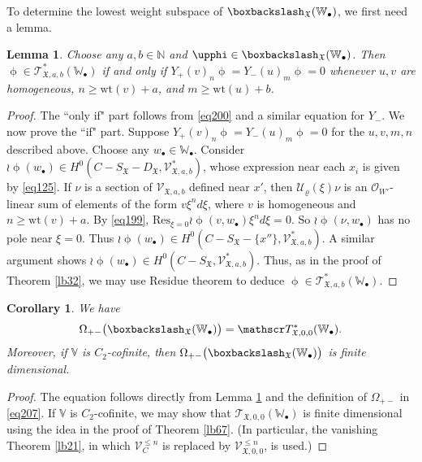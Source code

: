 \documentclass[12pt,a4paper,notitlepage]{report}
\theoremstyle{definition}
\theoremstyle{plain}
\newtheorem{co}[df]{Corollary}
\newtheorem{lm}[df]{Lemma}
\newcommand{\fk}{\mathfrak}
\newcommand{\mc}{\mathcal}
\newcommand{\Res}{\mathrm{Res}}
\newcommand{\scr}{\mathscr}
\newcommand{\SX}{S_{\fk X}}
\newcommand{\DX}{D_{\fk X}}
\newcommand{\blt}{\bullet}
\newcommand{\Vbb}{\mathbb V}
\newcommand{\Wbb}{\mathbb W}
\newcommand{\Nbb}{\mathbb N}
\newcommand{\wt}{\mathrm{wt}}
\numberwithin{equation}{section}
\begin{document}
To determine the lowest weight subspace of $\boxbackslash_{\fk X}(\Wbb_\blt)$, we first need a lemma.

\begin{lm}\label{lb103}
Choose any $a,b\in\Nbb$ and $\upphi\in\boxbackslash_{\fk X}(\Wbb_\blt)$. Then $\upphi\in\scr T_{\fk X,a,b}^*(\Wbb_\blt)$ if and only if $Y_+(v)_n\upphi=Y_-(u)_m \upphi=0$ whenever $u,v$ are homogeneous, $n\geq\wt(v)+a$, and $m\geq\wt(u)+b$.
\end{lm}




\begin{proof}
The ``only if" part follows from \eqref{eq200} and a similar equation for $Y_-$. We now prove the ``if" part. Suppose  $Y_+(v)_n\upphi=Y_-(u)_m \upphi=0$ for the $u,v,m,n$ described above. Choose any $w_\blt\in\Wbb_\blt$. Consider $\wr\upphi(w_\blt)\in H^0(C-\SX-\DX,\scr V_{\fk X,a,b}^*)$, whose expression near each $x_i$ is given by \eqref{eq125}. If $\nu$ is a section of $\scr V_{\fk X,a,b}$ defined near $x'$, then $\mc U_\varrho(\xi)\nu$ is an $\scr O_{W'}$-linear sum of elements of the form $v\xi^nd\xi$,   where $v$ is homogeneous and $n\geq\wt(v)+a$. By \eqref{eq199}, $\Res_{\xi=0}\wr\upphi(v,w_\blt)\xi^nd\xi=0$. So $\wr\upphi(\nu,w_\blt)$ has no pole near $\xi=0$. Thus $\wr\upphi(w_\blt)\in H^0(C-\SX-\{x''\},\scr V_{\fk X,a,b}^*)$. A similar argument shows $\wr\upphi(w_\blt)\in H^0(C-\SX,\scr V_{\fk X,a,b}^*)$. Thus, as in the proof of Theorem \ref{lb32}, we may use Residue theorem to deduce $\upphi\in\scr T_{\fk X,a,b}^*(\Wbb_\blt)$.
\end{proof}



\begin{co}\label{lb105}
We have
\begin{align}
\Omega_{+-}\big(\boxbackslash_{\fk X}(\Wbb_\blt)\big)=\scr T_{\fk X,0,0}^*(\Wbb_\blt).
\end{align}
Moreover, if $\Vbb$ is $C_2$-cofinite, then $\Omega_{+-}\big(\boxbackslash_{\fk X}(\Wbb_\blt)\big)$ is finite dimensional.
\end{co}





\begin{proof}
The equation follows directly from Lemma \ref{lb103} and the definition of $\Omega_{+-}$ in \eqref{eq207}. If $\Vbb$ is $C_2$-cofinite, we may show that $\scr T_{\fk X,0,0}(\Wbb_\blt)$ is finite dimensional using the idea in the proof of Theorem \ref{lb67}. (In particular, the vanishing Theorem \ref{lb21}, in which  $\scr V_C^{\leq n}$ is replaced by $\scr V_{\fk X,0,0}^{\leq n}$, is used.)
\end{proof}
\end{document}
